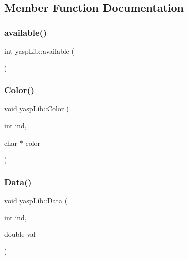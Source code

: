 \subsection{Member Function Documentation}
\mbox{\label{classyasp_lib_a7c052a8592e42a0b57044ddfada102e1}} 
\subsubsection{\texorpdfstring{available()}{available()}}
{\footnotesize\ttfamily int yasp\+Lib\+::available (\begin{DoxyParamCaption}{ }\end{DoxyParamCaption})\hspace{0.3cm}{\ttfamily [private]}}

\mbox{\label{classyasp_lib_a49bbfb260ce51983694c3a3d415e7857}} 
\subsubsection{\texorpdfstring{Color()}{Color()}}
{\footnotesize\ttfamily void yasp\+Lib\+::\+Color (\begin{DoxyParamCaption}\item[{int}]{ind,  }\item[{char $\ast$}]{color }\end{DoxyParamCaption})}

\mbox{\label{classyasp_lib_a5020a42b49db74ebd02fc41e2b9e3b91}} 
\subsubsection{\texorpdfstring{Data()}{Data()}}
{\footnotesize\ttfamily void yasp\+Lib\+::\+Data (\begin{DoxyParamCaption}\item[{int}]{ind,  }\item[{double}]{val }\end{DoxyParamCaption})}

\mbox{\label{classyasp_lib_a3477505d716271e0ef72f9d645f3ce96}} 
